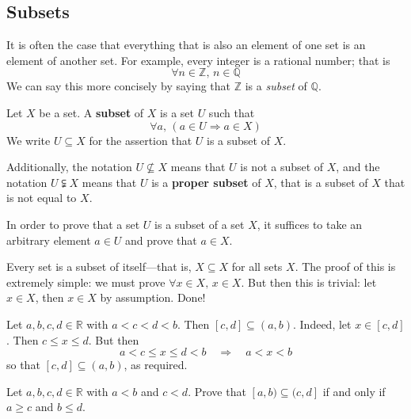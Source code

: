 \subsection*{Subsets}

It is often the case that everything that is also an element of one set is an element of another set. For example, every integer is a rational number; that is
\[ \forall n \in \mathbb{Z},\, n \in \mathbb{Q} \]
We can say this more concisely by saying that $\mathbb{Z}$ is a \textit{subset} of $\mathbb{Q}$.

\begin{definition}
\label{defSubset}
Let $X$ be a set. A \textbf{subset} of $X$ is a set $U$ such that
\[ \forall a,\, (a \in U \Rightarrow a \in X) \]
We write $U \subseteq X$  for the assertion that $U$ is a subset of $X$.

Additionally, the notation $U \nsubseteq X$  means that $U$ is not a subset of $X$, and the notation $U \subsetneqq X$  means that $U$ is a \textbf{proper subset} of $X$, that is a subset of $X$ that is not equal to $X$.
\end{definition}

\begin{strategy}
In order to prove that a set $U$ is a subset of a set $X$, it suffices to take an arbitrary element $a \in U$ and prove that $a \in X$.
\end{strategy}

\begin{example}
Every set is a subset of itself---that is, $X \subseteq X$ for all sets $X$. The proof of this is extremely simple: we must prove $\forall x \in X,\, x \in X$. But then this is trivial: let $x \in X$, then $x \in X$ by assumption. Done!
\end{example}

\begin{example}
Let $a,b,c,d \in \mathbb{R}$ with $a<c<d<b$. Then $[c,d] \subseteq (a,b)$. Indeed, let $x \in [c,d]$. Then $c \le x \le d$. But then
\[ a < c \le x \le d < b \quad \Rightarrow \quad a < x < b \]
so that $[c,d] \subseteq (a,b)$, as required.
\end{example}

\begin{exercise}
Let $a,b,c,d \in \mathbb{R}$ with $a<b$ and $c<d$. Prove that $[a,b) \subseteq (c,d]$ if and only if $a \ge c$ and $b \le d$.
\end{exercise}

